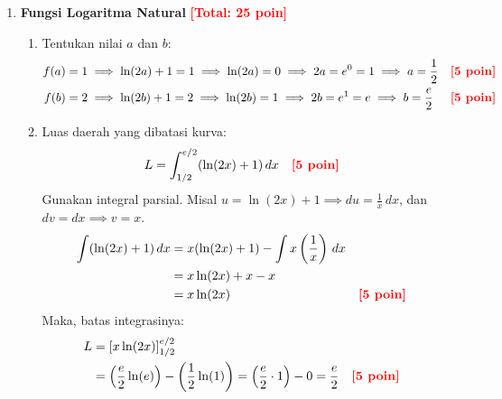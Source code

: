 \documentclass[a4paper,12pt]{article}
\begin{document}
\begin{enumerate}
  \item \textbf{Fungsi Logaritma Natural} \hfill \textcolor{red}{\textbf{[Total: 25 poin]}}
        \begin{enumerate}
          \item[(a)] Tentukan nilai $a$ dan $b$:
                \begin{align*}
                  f(a) = 1 & \implies \ln(2a) + 1 = 1 \implies \ln(2a) = 0 \implies 2a = e^0 = 1 \implies a = \frac{1}{2} &  & \text{\textcolor{red}{\textbf{[5 poin]}}} \\
                  f(b) = 2 & \implies \ln(2b) + 1 = 2 \implies \ln(2b) = 1 \implies 2b = e^1 = e \implies b = \frac{e}{2} &  & \text{\textcolor{red}{\textbf{[5 poin]}}}
                \end{align*}

          \item[(b)] Luas daerah yang dibatasi kurva:
                \begin{align*}
                  L & = \int_{1/2}^{e/2} (\ln(2x) + 1) \,dx &  & \text{\textcolor{red}{\textbf{[5 poin]}}}
                \end{align*}
                Gunakan integral parsial. Misal $u = \ln(2x) + 1 \implies du = \frac{1}{x}\,dx$, dan $dv = dx \implies v = x$.
                \begin{align*}
                  \int (\ln(2x) + 1) \,dx & = x(\ln(2x) + 1) - \int x \left(\frac{1}{x}\right) \,dx                                                \\
                                          & = x\ln(2x) + x - x                                                                                     \\
                                          & = x\ln(2x)                                              &  & \text{\textcolor{red}{\textbf{[5 poin]}}}
                \end{align*}
                Maka, batas integrasinya:
                \begin{align*}
                  L & = \left[ x\ln(2x) \right]_{1/2}^{e/2}                                                                                                                                       \\
                    & = \left( \frac{e}{2}\ln(e) \right) - \left( \frac{1}{2}\ln(1) \right) = \left( \frac{e}{2} \cdot 1 \right) - 0 = \frac{e}{2} &  & \text{\textcolor{red}{\textbf{[5 poin]}}}
                \end{align*}
        \end{enumerate}


\end{enumerate}
\end{document}
